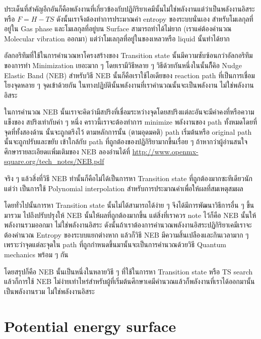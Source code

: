 ประเด็นที่สำคัญอีกอันก็คือพลังงานที่เกี่ยวข้องกับปฏิกิริยาเคมีนั้นไม่ใช่พลังงานแต่ว่าเป็นพลังงานอิสระหรือ 
$F = H - TS$ ดังนั้นเราจึงต้องทำการประมาณค่า entropy ของระบบนั่นเอง สำหรับโมเลกุลที่อยู่ใน 
Gas phase และโมเลกุลที่อยู่บน Surface สามารถทำได้ไม่ยาก (เราแค่ต้องคำนวณ Molecular 
vibration ออกมา) แต่ว่าโมเลกุลที่อยู่ในของเหลวหรือ liquid นั้นทำได้ยาก

อัลกอริทึมที่ใช้ในการคำนวณหาโครงสร้างของ Transition state นั้นมีความซับซ้อนกว่าอัลกอริทึมของการทำ 
Minimization เยอะมาก ๆ โดยเรามีวิธีหลาย ๆ วิธีด้วยกันหนึ่งในนั้นก็ึคิอ Nudge Elastic Band (NEB) 
สำหรับวิธี NEB นั้นก็คือเราใช้ไอเดียของ reaction path ที่เป็นการเชื่อมโยงจุดหลาย ๆ จุดเข้าด้วยกัน 
ในทางปฏิบัตินั้นพลังงานที่เราคำนวณนั้นจะเป็นพลังงาน ไม่ใช่พลังงานอิสระ

ในการคำนวณ NEB นั้นเราจะคิดว่ามีสปริงที่เชื่อมระหว่างจุดโดยสปริงแต่ละอันจะมีค่าคงที่หรือความแข็งของ%
สปริงเท่ากับค่า ๆ หนึ่ง คราวนี้เราจะต้องทำการ minimize พลังงานของ path ทั้งหมดโดยที่จุดที่ทั้งสองด้าน%
นั้นจะถูกตรึงไว้ ตามหลักการนั้น (ตามอุดมคติ) path เริ่มต้นหรือ original path นั้นจะถูกปรับและขยับ%
เข้าใกล้กับ path ที่ถูกต้องของปฏิกิริยามากขึ้นเรื่อย ๆ ถ้าหากว่าผู้อ่านสนใจศึกษารายละเอียดเเพิ่มเติมของ 
NEB ลองอ่านได้ที่ \url{http://www.openmx- square.org/tech_notes/NEB.pdf}

จริง ๆ แล้วสิ่งที่วิธี NEB ทำนั้นก็คือไม่ได้เป็นการหา Transition state ที่ถูกต้องมากซะทีเดียวนักแต่ว่า%
เป็นการใช้ Polynomial interpolation สำหรับการประมาณค่าเพื่อให้ผลที่สมเหตุสมผล 

โดยทั่วไปนั้นการหา Transition state นั้นไม่ได้สามารถได้ง่าย ๆ จึงได้มีการพัฒนาวิธีการอื่น ๆ ขึ้นมารวม%
ไปถึงปรับปรุงให้ NEB นั้นให้ผลที่ถูกต้องมากขึ้น แต่สิ่งที่เราควร note ไว้ก็คือ NEB นั้นให้พลังงานรวมออกมา
ไม่ใช่พลังงานอิสระ ดังนั้นถ้าเราต้องการคำนวณพลังงานอิสระปฏิกิริยาเคมีเราจะต้องคำนวณ Entropy 
ของระบบแยกต่างหาก แล้วก็วิธี NEB มีความสิ้นเปลืองและกินเวลามาก ๆ เพราะว่าจุดแต่ละจุดใน path 
ที่ถูกกำหนดขึ้นมานั้นจะเป็นการคำนวณด้วยวิธี Quantum mechanics พร้อม ๆ กัน 

โดยสรุปก็คือ NEB นั้นเป็นหนึ่งในหลายวิธี ๆ ที่ใช้ในการหา Transition state หรือ TS search 
แล้วก็การใช้ NEB ไม่ง่ายเท่าไหร่สำหรับผู้ที่เริ่มต้นศึกษาเคมีคำนวณแล้วก็พลังงานที่เราได้ออกมานั้นเป็นพลังงานรวม 
ไม่ใช่พลังงานอิสระ 

\section{Potential energy surface}

